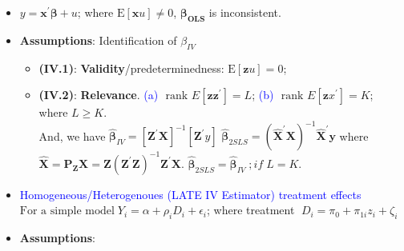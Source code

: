 \documentclass[
]{article}
\begin{document}
\begin{itemize}
\item
  \(y=\mathbf{x}^{\prime} \boldsymbol{\beta}+u\); where
  \(\mathrm{E}[\mathbf{x} u]\neq 0\), \(\boldsymbol{\beta_{OLS}}\) is
  inconsistent.
\item
  \textbf{Assumptions}: Identification of \(\beta_{IV}\)

  \begin{itemize}
  \item
    \textbf{(IV.1)}: \textbf{Validity}/predeterminedness:
    \(\mathrm{E}[\mathbf{z} u]=0\);
  \item
    \textbf{(IV.2)}: \textbf{Relevance}. \textcolor{blue}{(a)}
    \(\text { rank } E\left[\mathbf{z z}^{\prime}\right]=L\);
    \textcolor{blue}{(b)}
    \(\text { rank } E\left[\mathbf{z} x^{\prime}\right]=K\); where
    \(L \geqslant K\).\\
    And, we have
    \(\widehat{\boldsymbol{\beta}}_{I V}=\left[\mathbf{Z^\prime} \mathbf{X}\right]^{-1} [\mathbf{Z^\prime} y]\)
    \(\widehat{\boldsymbol{\beta}}_{2SLS}=\left(\hat{\mathbf{X}}^{\prime} \mathbf{X}\right)^{-1} \hat{\mathbf{X}}^{\prime}{\mathbf{y}}\)
    where
    \(\hat{\mathbf{X}}=\mathrm{\mathbf{P_Z X}}= \mathbf{Z}\left(\mathbf{Z}^{\prime} \mathbf{Z}\right)^{-1} \mathbf{Z}^{\prime} \mathbf{X}\).
    \(\widehat{\boldsymbol{\beta}}_{2SLS} = \widehat{\boldsymbol{\beta}}_{IV}\;; if \; L = K\).
  \end{itemize}
\item
  \textcolor{blue}{Homogeneous/Heterogenoues (LATE IV Estimator) treatment
  effects}\\
  \(\text{For a simple model}\; Y_{i}=\alpha+\rho_{i} D_{i}+\epsilon_{i}\);
  where treatment \(\;D_{i}=\pi_{0}+\pi_{1 i} z_{i}+\zeta_{i}\)
\item
  \textbf{Assumptions}:
\end{itemize}
\end{document}
